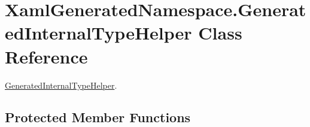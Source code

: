 \hypertarget{class_xaml_generated_namespace_1_1_generated_internal_type_helper}{
\section{XamlGeneratedNamespace.GeneratedInternalTypeHelper Class Reference}
\label{class_xaml_generated_namespace_1_1_generated_internal_type_helper}
}


\hyperlink{class_xaml_generated_namespace_1_1_generated_internal_type_helper}{GeneratedInternalTypeHelper}.  


\subsection*{Protected Member Functions}
